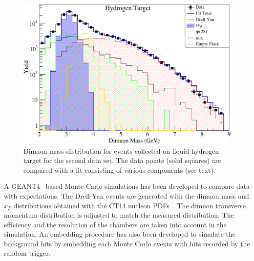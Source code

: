 \documentclass[reprint,aps,unsortedaddress,superscriptaddress,prl,floatfix,showpacs,linenumbers]{revtex4-2}
\begin{document}
\begin{figure}[htbp!]
	\centering
	\includegraphics[width=\linewidth]{massfit_run56_LH2.pdf}
	\caption{Dimuon mass distribution for events collected
		on liquid hydrogen target for the second data set.
		The data points (solid squares) are compared with a fit consisting of
		various components (see text).}
	\label{fig:massfit}
\end{figure}

A GEANT4~\cite{agostinelli2003,allison2006,allison2016} based Monte
Carlo simulations has been developed to compare data with expectations.
The Drell-Yan events are generated with the dimuon mass and $x_F$
distributions obtained with the CT14 nucleon PDFs~\cite{hou2018}.
The dimuon transverse momentum distribution is adjusted to match the measured distribution.
The efficiency and the resolution of the chambers are taken into account in the simulation.
An embedding procedure has also been developed to simulate the background hits by embedding each Monte Carlo events
with hits recorded by the random trigger.
\end{document}

